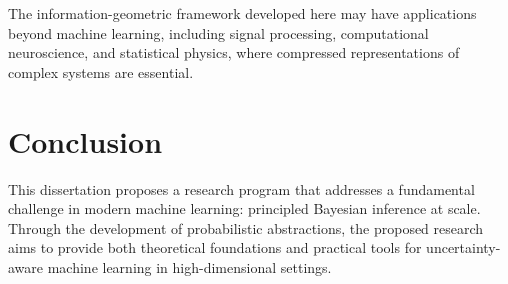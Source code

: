 \documentclass[
    language=english,
    doctype=dissertation-proposal,
    institution=none,
]{../../omnilatex}
\begin{document}
The information-geometric framework developed here may have applications
beyond machine learning, including signal processing, computational
neuroscience, and statistical physics, where compressed representations
of complex systems are essential.

\section{Conclusion}
\label{sec:conclusion}

This dissertation proposes a research program that addresses a fundamental
challenge in modern machine learning: principled Bayesian inference at
scale. Through the development of probabilistic abstractions, the proposed
research aims to provide both theoretical foundations and practical tools
for uncertainty-aware machine learning in high-dimensional settings.



\end{document}
